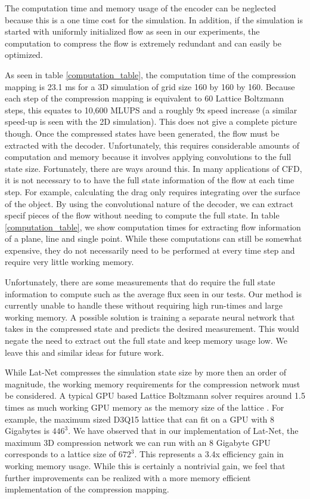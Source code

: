 \documentclass{article}
\begin{document}
The computation time and memory usage of the encoder can be neglected because this is a one time cost for the simulation. In addition, if the simulation is started with uniformly initialized flow as seen in our experiments, the computation to compress the flow is extremely redundant and can easily be optimized.

As seen in table \ref{computation_table}, the computation time of the compression mapping is 23.1 ms for a 3D simulation of grid size 160 by 160 by 160. Because each step of the compression mapping is equivalent to 60 Lattice Boltzmann steps, this equates to 10,600 MLUPS and a roughly 9x speed increase (a similar speed-up is seen with the 2D simulation). This does not give a complete picture though. Once the compressed states have been generated, the flow must be extracted with the decoder. Unfortunately, this requires considerable amounts of computation and memory because it involves applying convolutions to the full state size. Fortunately, there are ways around this. In many applications of CFD, it is not necessary to to have the full state information of the flow at each time step. For example, calculating the drag only requires integrating over the surface of the object. By using the convolutional nature of the decoder, we can extract specif pieces of the flow without needing to compute the full state. In table \ref{computation_table}, we show computation times for extracting flow information of a plane, line and single point. While these computations can still be somewhat expensive, they do not necessarily need to be performed at every time step and require very little working memory. 

Unfortunately, there are some measurements that do require the full state information to compute such as the average flux seen in our tests. Our method is currently unable to handle these without requiring high run-times and large working memory. A possible solution is training a separate neural network that takes in the compressed state and predicts the desired measurement. This would negate the need to extract out the full state and keep memory usage low. We leave this and similar ideas for future work.

While Lat-Net compresses the simulation state size by more then an order of magnitude, the working memory requirements for the compression network must be considered. A typical GPU based Lattice Boltzmann solver requires around 1.5 times as much working GPU memory as the memory size of the lattice \cite{januszewski2014sailfish}. For example, the maximum sized D3Q15 lattice that can fit on a GPU with 8 Gigabytes is $446^3$. We have observed that in our implementation of Lat-Net, the maximum 3D compression network we can run with an 8 Gigabyte GPU corresponds to a lattice size of $672^3$. This represents a 3.4x efficiency gain in working memory usage. While this is certainly a nontrivial gain, we feel that further improvements can be realized with a more memory efficient implementation of the compression mapping.
\end{document}
